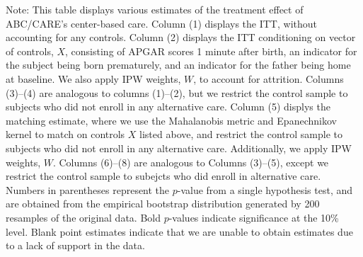 \begin{table}[H]
\begin{threeparttable}
\begin{tabular}{cccccccccc}
  \hline\hline
  \end{tabular}
    \begin{tablenotes}
    \scriptsize
    \item 
Note: This table displays various estimates of the treatment effect of ABC/CARE's center-based care.
Column (1) displays the ITT, without accounting for any controls.
Column (2) displays the ITT conditioning on vector of controls, $X$, consisting of APGAR scores 1 
minute after birth, an indicator for the subject being born prematurely, and an indicator for the 
father being home at baseline. We also apply IPW weights, $W$, to account for attrition.
Columns (3)--(4) are analogous to columns (1)--(2), but we restrict the control sample to subjects
who did not enroll in any alternative care.
Column (5) displys the matching estimate, where we use the Mahalanobis metric and Epanechnikov kernel
to match on controls $X$ listed above, and restrict the control sample to subjects who did not enroll
in any alternative care. Additionally, we apply IPW weights, $W$.
Columns (6)--(8) are analogous to Columns (3)--(5), except we restrict the control sample to subejcts
who did enroll in alternative care. 
Numbers in parentheses represent the $p$-value from a single hypothesis test, and are obtained from 
the empirical bootstrap distribution generated by 200 resamples of the original data. 
Bold $p$-values indicate significance at the 10\% level.
Blank point estimates indicate that we are unable to obtain estimates due to a lack of support in the data. 

    \end{tablenotes}
  \end{threeparttable}

\end{table}